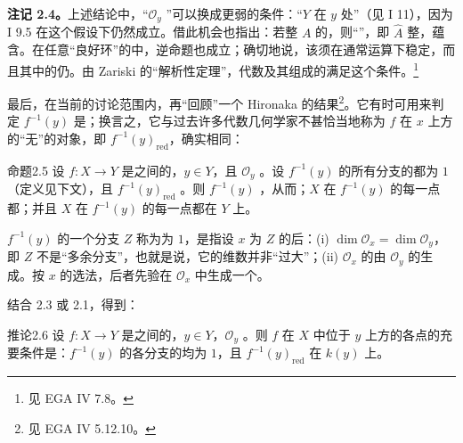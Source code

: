\textbf{注记 2.4。}上述结论中，“$\mathcal O_y$ ”可以换成更弱的条件：“$Y$ 在 $y$ 处”（见 I 11），因为 I 9.5 在这个假设下仍然成立。借此机会也指出：若整 $A$ 的，则“”，即 $\widehat A$ 整，蕴含。在任意“良好环”的中，逆命题也成立；确切地说，该须在通常运算下稳定，而且其中的仍。由 Zariski 的“解析性定理”，代数及其组成的满足这个条件。\footnote{见 EGA IV 7.8。}

最后，在当前的讨论范围内，再“回顾”一个 Hironaka 的结果\footnote{见 EGA IV 5.12.10。}。它有时可用来判定 $f^{-1}(y)$ 是；换言之，它与过去许多代数几何学家不甚恰当地称为 $f$ 在 $x$ 上方的“无”的对象，即 $f^{-1}(y)_{\mathrm{red}}$，确实相同：

\begin{SGAresult}{命题}{2.5}
设 $f:X\to Y$ 是之间的，$y\in Y$，且 $\mathcal O_y$ 。设 $f^{-1}(y)$ 的所有分支的都为 $1$（定义见下文），且 $f^{-1}(y)_{\mathrm{red}}$ 。则 $f^{-1}(y)$ ，从而；$X$ 在 $f^{-1}(y)$ 的每一点都；并且 $X$ 在 $f^{-1}(y)$ 的每一点都在 $Y$ 上。
\end{SGAresult}

$f^{-1}(y)$ 的一个分支 $Z$ 称为为 $1$，是指设 $x$ 为 $Z$ 的后：\textup{(i)} $\dim\mathcal O_x=\dim\mathcal O_y$，即 $Z$ 不是“多余分支”，也就是说，它的维数并非“过大”；\textup{(ii)} $\mathcal O_x$ 的由 $\mathcal O_y$ 的生成。按 $x$ 的选法，后者先验在 $\mathcal O_x$ 中生成一个。

结合 2.3 或 2.1，得到：
\begin{SGAresult}{推论}{2.6}
设 $f:X\to Y$ 是之间的，$y\in Y$，$\mathcal O_y$ 。则 $f$ 在 $X$ 中位于 $y$ 上方的各点的充要条件是：$f^{-1}(y)$ 的各分支的均为 $1$，且 $f^{-1}(y)_{\mathrm{red}}$ 在 $k(y)$ 上。
\end{SGAresult}

